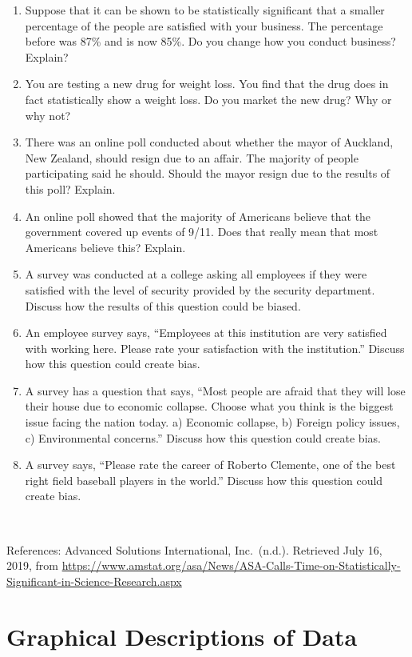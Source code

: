 \documentclass[
]{book}
\begin{document}
\begin{enumerate}
\item
  Suppose that it can be shown to be statistically significant that a smaller percentage of the people are satisfied with your business. The percentage before was 87\% and is now 85\%. Do you change how you conduct business? Explain?
\item
  You are testing a new drug for weight loss. You find that the drug does in fact statistically show a weight loss. Do you market the new drug? Why or why not?
\item
  There was an online poll conducted about whether the mayor of Auckland, New Zealand, should resign due to an affair. The majority of people participating said he should. Should the mayor resign due to the results of this poll? Explain.
\item
  An online poll showed that the majority of Americans believe that the government covered up events of 9/11. Does that really mean that most Americans believe this? Explain.
\item
  A survey was conducted at a college asking all employees if they were satisfied with the level of security provided by the security department. Discuss how the results of this question could be biased.
\item
  An employee survey says, ``Employees at this institution are very satisfied with working here. Please rate your satisfaction with the institution.'' Discuss how this question could create bias.
\item
  A survey has a question that says, ``Most people are afraid that they will lose their house due to economic collapse. Choose what you think is the biggest issue facing the nation today. a) Economic collapse, b) Foreign policy issues, c) Environmental concerns.'' Discuss how this question could create bias.
\item
  A survey says, ``Please rate the career of Roberto Clemente, one of the best right field baseball players in the world.'' Discuss how this question could create bias.
\end{enumerate}

\emph{\\
}

References:
Advanced Solutions International, Inc.~(n.d.). Retrieved July 16, 2019, from \url{https://www.amstat.org/asa/News/ASA-Calls-Time-on-Statistically-Significant-in-Science-Research.aspx}

\hypertarget{graphical-descriptions-of-data}{%
\chapter{Graphical Descriptions of Data}\label{graphical-descriptions-of-data}}
\end{document}
